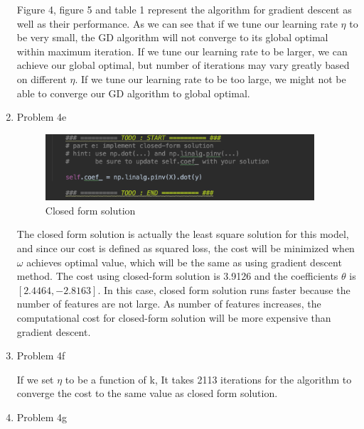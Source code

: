 \documentclass[11pt]{article}
\newcommand{\solution}[1]{{{\color{black}{\bf Solution:} {#1}}}}
\begin{document}
\begin{enumerate}
{	Figure 4, figure 5 and table 1 represent the algorithm for gradient descent as well as their performance. As we can see that if we tune our learning rate $\eta$ to be very small, the GD algorithm will not converge to its global optimal within maximum iteration. If we tune our learning rate to be larger, we can achieve our global optimal, but number of iterations may vary greatly based on different $\eta$. If we tune our learning rate to be too large, we might not be able to converge our GD algorithm to global optimal.
	
	
	
	}
	
	\vspace{2cm}
	
	\item Problem 4e
	
	\solution{
	
	\begin{figure}[h!]
	\centering
	\includegraphics[width = 10cm]{4e}
	\caption{Closed form solution}
	\end{figure}
	
	
		The closed form solution is actually the least square solution for this model, and since our cost is defined as squared loss, the cost will be minimized when $\omega$ achieves optimal value, which will be the same as using gradient descent method. The cost using closed-form solution is 3.9126 and the coefficients $\theta$ is $[2.4464, -2.8163]$. In this case, closed form solution runs faster because the number of features are not large. As number of features increases, the computational cost for closed-form solution will be more expensive than gradient descent.
	
	}
	
	\vspace{2cm}
	
	\item Problem 4f \newline
	
	\solution{
	If we set $\eta$ to be a function of k, It takes 2113 iterations for the algorithm to converge the cost to the same value as closed form solution.
	
	}
	
	\item Problem 4g
	

\end{enumerate}
\end{document}

